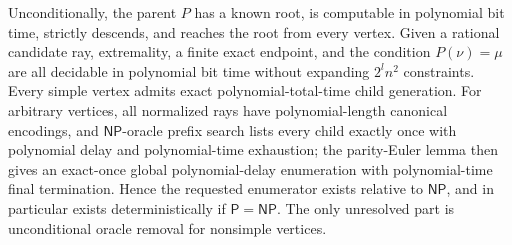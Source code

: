 Unconditionally, the parent \(P\) has a known root, is computable in polynomial bit time, strictly descends, and reaches the root from every vertex. Given a rational candidate ray, extremality, a finite exact endpoint, and the condition \(P(\nu)=\mu\) are all decidable in polynomial bit time without expanding \(2^l n^2\) constraints. Every simple vertex admits exact polynomial-total-time child generation. For arbitrary vertices, all normalized rays have polynomial-length canonical encodings, and \(\mathsf{NP}\)-oracle prefix search lists every child exactly once with polynomial delay and polynomial-time exhaustion; the parity-Euler lemma then gives an exact-once global polynomial-delay enumeration with polynomial-time final termination. Hence the requested enumerator exists relative to \(\mathsf{NP}\), and in particular exists deterministically if \(\mathsf P=\mathsf{NP}\). The only unresolved part is unconditional oracle removal for nonsimple vertices.